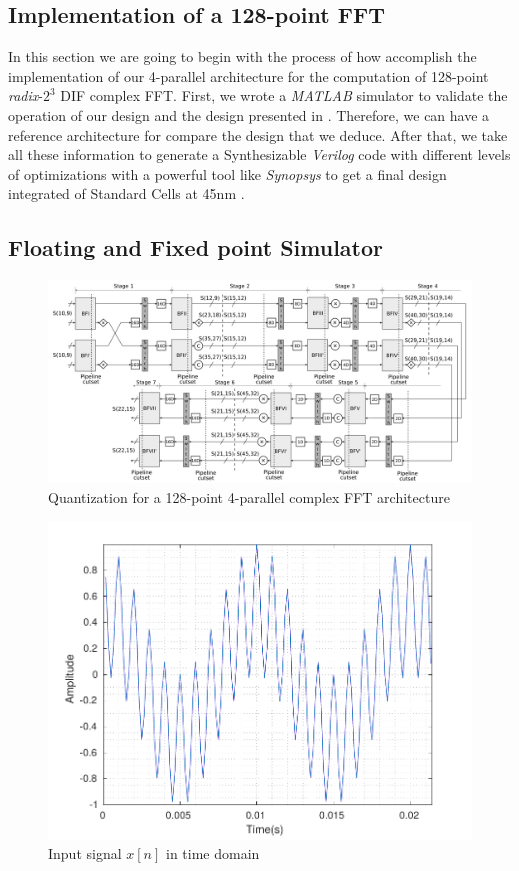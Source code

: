 \documentclass[journal,comsoc]{IEEEtran}
\begin{document}
\subsection{Implementation of a 128-point FFT}
In this section we are going to begin with the process of how accomplish the implementation of our 4-parallel architecture for the computation of 128-point \textit{radix}-$2^3$ DIF complex FFT.
First, we wrote a \textit{MATLAB} simulator to validate the operation of our design and the design presented in \cite{garrido_pipelined_2013,garrido_feedforward_2018}. Therefore, we can have a reference architecture for compare the design that we deduce. After that, we take all these information to generate a Synthesizable \textit{Verilog} code with different levels of optimizations with a powerful tool like \textit{Synopsys} to get a final design integrated of Standard Cells at 45nm \cite{freePdk}.
\subsection{Floating and Fixed point Simulator}
\begin{figure} 
	\centering
	\includegraphics[width=0.95\linewidth]{Diagramas/folding-128-quant-pipe.png}
	\caption{Quantization for a 128-point 4-parallel complex FFT architecture}
	\label{fig:4paralelo128pradix8cuantizacion1}
\end{figure}

\begin{figure} 
	\centering
	\includegraphics[width=0.92\linewidth]{Diagramas/DftInputSignal.pdf}
	\caption{Input signal $x[n]$ in time domain}
	\label{fig:dftinputsignal}
\end{figure}
\end{document}
